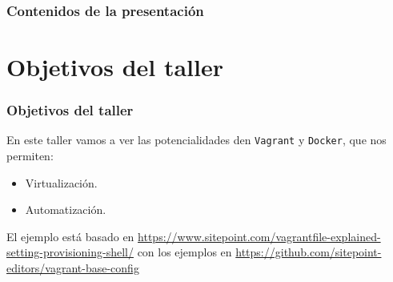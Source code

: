 \documentclass[xcolor=dvipsnames]{beamer}
\begin{document}
	\begin{frame}
			\frametitle{Contenidos de la presentación}
				\tableofcontents[
					sectionstyle=show/show,
					subsectionstyle=hide/hide/hide
				]
	\end{frame}
	
	\AtBeginSection[] {
		\begin{frame}
			\tableofcontents[
			sectionstyle=show/shaded,
			subsectionstyle=hide/hide/hide
			]
		\end{frame}
	}





%






\section{Objetivos del taller}
\begin{frame}[fragile]
	\frametitle{Objetivos del taller}

En este taller vamos a ver las potencialidades den \texttt{Vagrant} y \texttt{Docker}, que nos permiten:
		\begin{itemize}
			\item Virtualización.
			\item Automatización.
		\end{itemize}
	
	El ejemplo está basado en \url{https://www.sitepoint.com/vagrantfile-explained-setting-provisioning-shell/} con los ejemplos en \url{https://github.com/sitepoint-editors/vagrant-base-config}

\end{frame}
\end{document}

